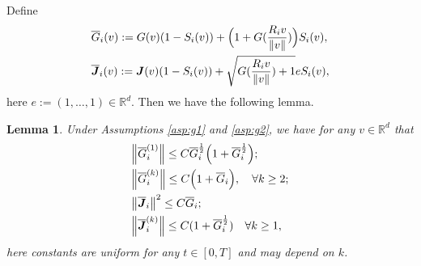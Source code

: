 \documentclass[a4paper, 11pt]{article}
\newcounter{results}[section]
\theoremstyle{plain}
\newtheorem{lemma}[results]{Lemma}
\theoremstyle{remark}
\theoremstyle{definition}
\newcommand{\e}{e}
\newcommand{\J}{\boldsymbol{J}}
\begin{document}
		Define
		\begin{eqnarray}
			&\overline{G}_i(v):=G(v)(1-S_i(v))+\Big(1+G(\frac{R_iv}{\norm{v}})\Big)S_i(v),\\
			&\overline{\J}_i(v):=\J(v)(1-S_i(v))+\sqrt{G(\frac{R_iv}{\norm{v}})+1}\e S_i(v),
		\end{eqnarray}
		here $e:=(1,\ldots,1)\in \mathbb{R}^d$.
		Then we have the following lemma.
		\begin{lemma}\label{lem:g25}Under Assumptions \ref{asp:g1} and \ref{asp:g2}, we have for any $v\in\mathbb{R}^d$ that
			\begin{eqnarray}
				&\norm{\overline{G}_i^{(1)}}\leq C\overline{G}^{\frac{1}{2}}_i\Big(1+\overline{G}^{\frac{1}{2}}_i\Big);\\
				&\norm{\overline{G}_i^{(k)}}\leq C\Big(1+{\overline{G}_i}\Big),\quad \forall k\geq 2;\\
				&\norm{\overline{\J}_i}^2\leq C\overline{G}_i;\\
				&\norm{\overline{\J}_i^{(k)}}\leq C(1+\overline{G}^{\frac{1}{2}}_i)\quad \forall k\geq 1,
			\end{eqnarray}
            here constants are uniform for any $t\in [0,T]$ and may depend on $k$.
		\end{lemma}
\end{document}
